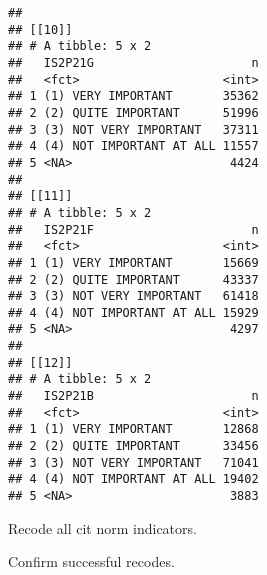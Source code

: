 \documentclass[]{article}
\newenvironment{Shaded}{\begin{snugshade}}{\end{snugshade}}
\newcommand{\DataTypeTok}[1]{\textcolor[rgb]{0.13,0.29,0.53}{#1}}
\newcommand{\KeywordTok}[1]{\textcolor[rgb]{0.13,0.29,0.53}{\textbf{#1}}}
\newcommand{\NormalTok}[1]{#1}
\newcommand{\OperatorTok}[1]{\textcolor[rgb]{0.81,0.36,0.00}{\textbf{#1}}}
\newcommand{\StringTok}[1]{\textcolor[rgb]{0.31,0.60,0.02}{#1}}
\begin{document}
\begin{verbatim}
## 
## [[10]]
## # A tibble: 5 x 2
##   IS2P21G                      n
##   <fct>                    <int>
## 1 (1) VERY IMPORTANT       35362
## 2 (2) QUITE IMPORTANT      51996
## 3 (3) NOT VERY IMPORTANT   37311
## 4 (4) NOT IMPORTANT AT ALL 11557
## 5 <NA>                      4424
## 
## [[11]]
## # A tibble: 5 x 2
##   IS2P21F                      n
##   <fct>                    <int>
## 1 (1) VERY IMPORTANT       15669
## 2 (2) QUITE IMPORTANT      43337
## 3 (3) NOT VERY IMPORTANT   61418
## 4 (4) NOT IMPORTANT AT ALL 15929
## 5 <NA>                      4297
## 
## [[12]]
## # A tibble: 5 x 2
##   IS2P21B                      n
##   <fct>                    <int>
## 1 (1) VERY IMPORTANT       12868
## 2 (2) QUITE IMPORTANT      33456
## 3 (3) NOT VERY IMPORTANT   71041
## 4 (4) NOT IMPORTANT AT ALL 19402
## 5 <NA>                      3883
\end{verbatim}

Recode all cit norm indicators.

\begin{Shaded}
\end{Shaded}

Confirm successful recodes.

\begin{Shaded}
\end{Shaded}
\end{document}
